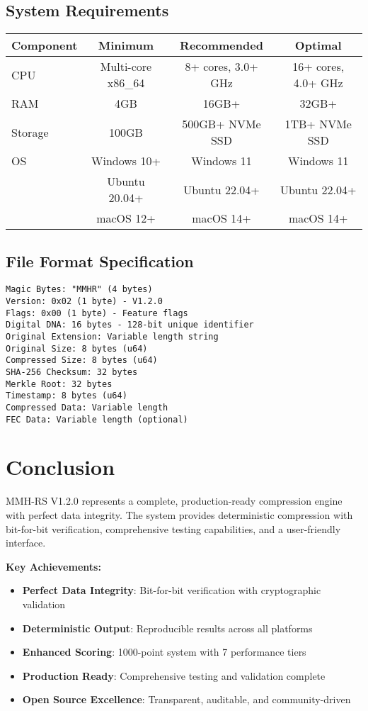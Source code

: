 \documentclass[12pt,a4paper]{article}
\begin{document}
\subsection{System Requirements}
\begin{center}
\begin{tabular}{|l|c|c|c|}
\hline
\textbf{Component} & \textbf{Minimum} & \textbf{Recommended} & \textbf{Optimal} \\
\hline
CPU & Multi-core x86\_64 & 8+ cores, 3.0+ GHz & 16+ cores, 4.0+ GHz \\
RAM & 4GB & 16GB+ & 32GB+ \\
Storage & 100GB & 500GB+ NVMe SSD & 1TB+ NVMe SSD \\
OS & Windows 10+ & Windows 11 & Windows 11 \\
& Ubuntu 20.04+ & Ubuntu 22.04+ & Ubuntu 22.04+ \\
& macOS 12+ & macOS 14+ & macOS 14+ \\
\hline
\end{tabular}
\end{center}

\subsection{File Format Specification}
\begin{lstlisting}[caption=File Format Details]
Magic Bytes: "MMHR" (4 bytes)
Version: 0x02 (1 byte) - V1.2.0
Flags: 0x00 (1 byte) - Feature flags
Digital DNA: 16 bytes - 128-bit unique identifier
Original Extension: Variable length string
Original Size: 8 bytes (u64)
Compressed Size: 8 bytes (u64)
SHA-256 Checksum: 32 bytes
Merkle Root: 32 bytes
Timestamp: 8 bytes (u64)
Compressed Data: Variable length
FEC Data: Variable length (optional)
\end{lstlisting}

\newpage

\section{Conclusion}

MMH-RS V1.2.0 represents a complete, production-ready compression engine with perfect data integrity. The system provides deterministic compression with bit-for-bit verification, comprehensive testing capabilities, and a user-friendly interface.

\textbf{Key Achievements:}
\begin{itemize}
    \item \textbf{Perfect Data Integrity}: Bit-for-bit verification with cryptographic validation
    \item \textbf{Deterministic Output}: Reproducible results across all platforms
    \item \textbf{Enhanced Scoring}: 1000-point system with 7 performance tiers
    \item \textbf{Production Ready}: Comprehensive testing and validation complete
    \item \textbf{Open Source Excellence}: Transparent, auditable, and community-driven
\end{itemize}
\end{document}
